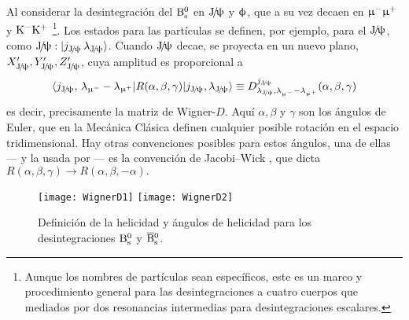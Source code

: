 Al considerar la desintegración del $\mathrm{B}{}_{\mathrm{s}}^{0}$ en $\mathrm{J}\!/\!\uppsi$ y $\upphi$, que a su vez decaen en $\upmu{}^{-} \upmu{}^{+}$ y  $\mathrm{K}{}^{-} \mathrm{K}{}^{+}$ \footnote{Aunque los nombres de partículas sean específicos, este es un marco y procedimiento general para las desintegraciones a cuatro cuerpos que mediados por dos resonancias intermedias para desintegraciones escalares.}.
%
Los estados para las partículas se definen, por ejemplo, para el $\mathrm{J}\!/\!\uppsi$, como $\mathrm{J}\!/\!\uppsi:  |j_{\mathrm{J}\!/\!\uppsi} \,\lambda_{\mathrm{J}\!/\!\uppsi}\rangle$. Cuando $\mathrm{J}\!/\!\uppsi$ decae, se proyecta en un nuevo plano, $X_{\mathrm{J}\!/\!\uppsi}',Y_{\mathrm{J}\!/\!\uppsi}',Z_{\mathrm{J}\!/\!\uppsi}'$, cuya amplitud es proporcional a 
\begin{equation*}
\langle j_{\Jpsi},\, \lambda_{\muon} - \lambda_{\antimuon} | R(\alpha,\beta,\gamma) | j_{\Jpsi} , \lambda_{\Jpsi} \rangle \equiv D_{\lambda_{\Jpsi},\lambda_{\muon} - \lambda_{\antimuon}}^{j_{\Jpsi}}	(\alpha,\beta,\gamma)
\end{equation*}
es decir, precisamente la matriz de Wigner-$D$. Aquí $\alpha,\beta$ y $\gamma$
son los ángulos de Euler, que en la Mecánica Clásica  definen cualquier posible rotación en el espacio tridimensional. Hay otras convenciones posibles para estos ángulos, una de ellas --- y la usada por \lhcb --- es la convención de Jacobi--Wick \cite{kutschke1996angular}, que dicta
$R(\alpha,\beta,\gamma)  \rightarrow R(\alpha,\beta,-\alpha).  $


\begin{figure}[H]
\centering
\texttt{[image: WignerD1]}
\hfill
\texttt{[image: WignerD2]}
\caption{Definición de la helicidad y ángulos de helicidad para los desintegraciones $\mathrm{B}{}_{\mathrm{s}}^{0}$ y $\overline{\mathrm{B}}{}_{\mathrm{s}}^{0}$.}	
\end{figure}



